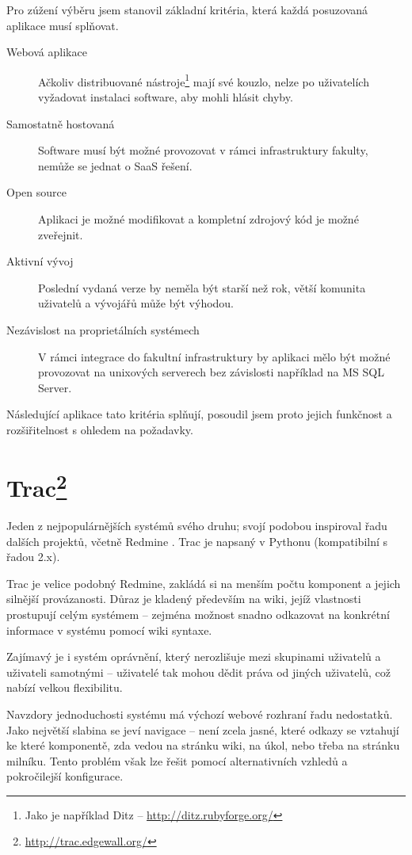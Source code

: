 \documentclass[thesis=B,czech]{FITthesis}[2012/05/02]
\begin{document}
Pro zúžení výběru jsem stanovil základní kritéria, která každá
posuzovaná aplikace musí splňovat.

\begin{description}
\item[Webová aplikace]
  Ačkoliv distribuované nástroje\footnote{Jako je například Ditz -- \url{http://ditz.rubyforge.org/}} mají své kouzlo,
  nelze po uživatelích vyžadovat instalaci software, aby mohli hlásit
  chyby.
\item[Samostatně hostovaná]
  Software musí být možné provozovat v rámci
  infrastruktury fakulty, nemůže se jednat o \gls{SaaS} řešení.
\item[Open source]
  Aplikaci je možné modifikovat a kompletní zdrojový kód
  je možné zveřejnit.
\item[Aktivní vývoj]
  Poslední vydaná verze by neměla být starší než rok,
  větší komunita uživatelů a vývojářů může být výhodou.
\item[Nezávislost na proprietálních systémech]
  V rámci integrace do
  fakultní infrastruktury by aplikaci mělo být možné provozovat na
  unixových serverech bez závislosti například na MS SQL Server.
\end{description}
Následující aplikace tato kritéria splňují, posoudil jsem proto jejich
funkčnost a rozšiřitelnost s ohledem na požadavky.

\section[Trac]{Trac\footnote{\url{http://trac.edgewall.org/}}}

Jeden z nejpopulárnějších systémů svého druhu; svojí podobou inspiroval
řadu dalších projektů, včetně Redmine \citep{TracRedMine}. Trac je
napsaný v Pythonu (kompatibilní s řadou 2.x).

Trac je velice podobný Redmine, zakládá si na menším počtu komponent a
jejich silnější provázanosti. Důraz je kladený především na wiki, jejíž
vlastnosti prostupují celým systémem -- zejména možnost snadno
odkazovat na konkrétní informace v systému pomocí wiki syntaxe.

Zajímavý je i systém oprávnění, který nerozlišuje mezi skupinami
uživatelů a uživateli samotnými -- uživatelé tak mohou dědit práva od
jiných uživatelů, což nabízí velkou flexibilitu.

Navzdory jednoduchosti systému má výchozí webové rozhraní řadu
nedostatků. Jako největší slabina se jeví navigace -- není zcela jasné,
které odkazy se vztahují ke které komponentě, zda vedou na stránku wiki,
na úkol, nebo třeba na stránku milníku. Tento problém však lze řešit
pomocí alternativních vzhledů a pokročilejší konfigurace.
\end{document}
